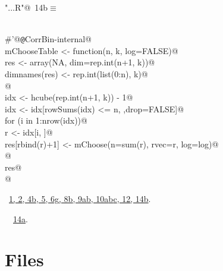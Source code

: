 \documentclass[reqno]{amsart}
\renewcommand{\NWtarget}[2]{\hypertarget{#1}{#2}}
\renewcommand{\NWlink}[2]{\hyperlink{#1}{#2}}
\begin{document}
\begin{flushleft} \small
\begin{minipage}{\linewidth}\label{scrap47}\raggedright\small
\NWtarget{nuweb14b}{} \verb@"..\R\ExchMultinomial.R"@\nobreak\ {\footnotesize {14b}}$\equiv$
\vspace{-1ex}
\begin{list}{}{} \item
\mbox{}\verb@@\\
\mbox{}\verb@#'@{\tt @}\verb@rdname CorrBin-internal@\\
\mbox{}\verb@  mChooseTable <- function(n, k, log=FALSE){@\\
\mbox{}\verb@    res <- array(NA, dim=rep.int(n+1, k))@\\
\mbox{}\verb@    dimnames(res) <- rep.int(list(0:n), k)@\\
\mbox{}\verb@    @\\
\mbox{}\verb@    idx <- hcube(rep.int(n+1, k)) - 1@\\
\mbox{}\verb@    idx <- idx[rowSums(idx) <= n, ,drop=FALSE]@\\
\mbox{}\verb@    for (i in 1:nrow(idx)){@\\
\mbox{}\verb@        r <- idx[i, ]@\\
\mbox{}\verb@        res[rbind(r)+1] <- mChoose(n=sum(r), rvec=r, log=log)@\\
\mbox{}\verb@    }@\\
\mbox{}\verb@    res@\\
\mbox{}\verb@  }@\\
\mbox{}\verb@@{\NWsep}
\end{list}
\vspace{-1.5ex}
\footnotesize
\begin{list}{}{\setlength{\itemsep}{-\parsep}\setlength{\itemindent}{-\leftmargin}}
\item \NWtxtFileDefBy\ \NWlink{nuweb1}{1}\NWlink{nuweb2}{, 2}\NWlink{nuweb4b}{, 4b}\NWlink{nuweb5}{, 5}\NWlink{nuweb6g}{, 6g}\NWlink{nuweb8b}{, 8b}\NWlink{nuweb9a}{, 9a}\NWlink{nuweb9b}{b}\NWlink{nuweb10a}{, 10a}\NWlink{nuweb10b}{b}\NWlink{nuweb10c}{c}\NWlink{nuweb12}{, 12}\NWlink{nuweb14b}{, 14b}.
\item \NWtxtIdentsUsed\nobreak\  \verb@mChoose@\nobreak\ \NWlink{nuweb14a}{14a}.
\item{}
\end{list}
\end{minipage}\vspace{4ex}
\end{flushleft}
\section{Files}
\end{document}
